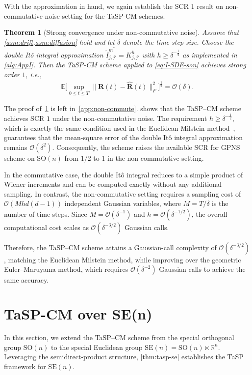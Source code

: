 \documentclass[11pt, a4paper, onecolumn]{article}
\newcommand{\SOn}{\mathrm{SO}(n)}
\newcommand{\SEn}{\mathrm{SE}(n)}
\newcommand{\R}{\mathbb{R}}
\newcommand{\E}{\mathbb{E}}
\newcommand{\bfR}{\mathbf{R}}
\newcommand{\hatR}{\widehat{\bfR}}
\newcommand{\calO}{\mathcal{O}}
\newcommand{\ms}{{m^*}}
\newcommand{\tIjjpms}{ { \tilde I_{j,j'}^{\ms}} }
\newcommand{\half}{{\frac{1}{2}}}
\newtheorem{theorem}{Theorem}
\begin{document}
With the approximation in hand, we again establish the SCR $1$ result on non-commutative noise setting for the TaSP-CM schemes.
\begin{theorem}[Strong convergence under non-commutative noise]\label{thm:convergence-non-comm}
Assume that \cref{asm:drift,asm:diffusion} hold and let $\delta$ denote the time-step size.  
Choose the double It\^o integral approximation $\tIjjpms = K_{j,j'}^{h}$ with $h \ge \delta^{-\half}$ as implemented in \cref{alg:AppI}.  
Then the TaSP-CM scheme applied to \eqref{eq:I-SDE-son} achieves strong order $1$, i.e.,
\begin{align*}
    \E\bigl[\sup_{0 \le t \le T} \| \bfR(t) - \hatR(t) \|_F^{2}\bigr]^{\half} = \calO(\delta).
\end{align*}
\end{theorem}

The proof of~\cref{thm:convergence-non-comm} is left in~\cref{app:non-commute}.  shows that the TaSP–CM scheme achieves SCR $1$ under the non-commutative noise. The requirement $h \ge \delta^{-\half}$, which is exactly the same condition used in the Euclidean Milstein method~\cite{mil1975approximate}, guarantees that the mean-square error of the double It\^o integral approximation remains $\mathcal{O}(\delta^2)$. Consequently, the scheme raises the available SCR for GPNS scheme on $\SOn$ from $1/2$ to 1 in the non-commutative setting.

In the commutative case, the double It\^o integral reduces to a simple product of Wiener increments and can be computed exactly without any additional sampling. In contrast, the non-commutative setting requires a sampling cost of $\mathcal{O}(M h d(d-1))$ independent Gaussian variables, where $M = T/\delta$ is the number of time steps. Since $M=\mathcal{O}(\delta^{-1})$ and $h=\mathcal{O}(\delta^{-1/2})$, the overall
computational cost scales as $\mathcal{O}(\delta^{-3/2})$ Gaussian calls. 

Therefore, the TaSP--CM scheme attains a Gaussian-call complexity of $\mathcal{O}(\delta^{-3/2})$, matching the Euclidean Milstein method, while improving over the geometric Euler--Maruyama method, which requires $\mathcal{O}(\delta^{-2})$ Gaussian calls to achieve the same accuracy.


\section{TaSP-CM over SE(n)}\label{sec:tasp-se}
In this section, we extend the TaSP–CM scheme from the special orthogonal group $\SOn$ to the special Euclidean group
$\SEn = \SOn \ltimes \R^{n}$. Leveraging the semidirect-product structure, \cref{thm:tasp-se} establishes the TaSP framework for $\SEn$.
\end{document}
